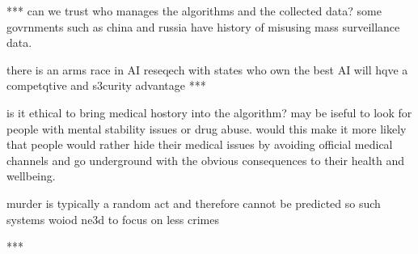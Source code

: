 *** can we trust who manages the algorithms and the collected data? 
some govrnments such as china and russia have history of misusing 
mass surveillance data. 

there is an arms race in AI reseqech with states who own the best AI will
hqve a competqtive and s3curity advantage ***

is it ethical to bring medical hostory into the algorithm? may be iseful to look for people with mental stability issues or drug abuse. would this make
it more likely that people would rather hide their medical issues by
avoiding official medical channels and go underground with the obvious 
consequences to their health and wellbeing.

murder is typically a random act and therefore cannot be predicted so
such systems woiod ne3d to focus on less crimes  



***







